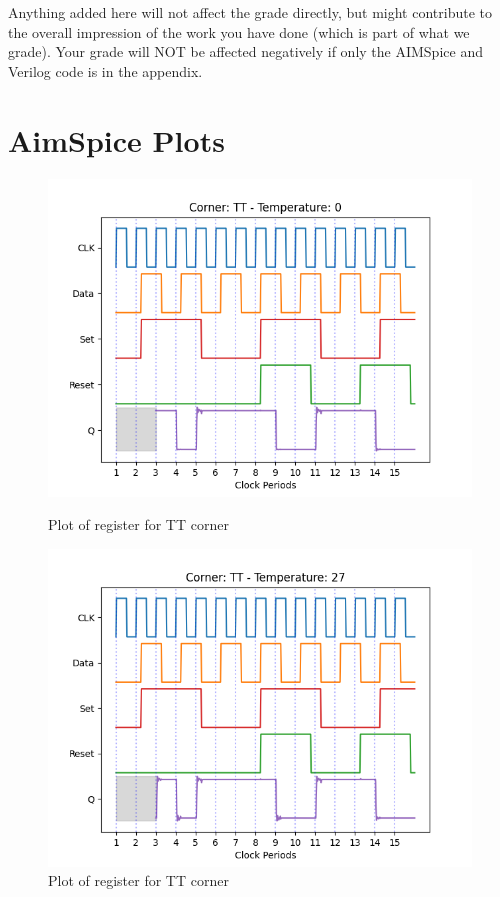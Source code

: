 Anything added here will not affect the grade directly, but might contribute to the overall impression of the work you have done (which is part of what we grade). Your grade will NOT be affected negatively if only the AIMSpice and Verilog code is in the appendix.

\newpage
\section{AimSpice Plots}
\label{appendix:aimspicePlots}

\begin{figure}[H]
    \begin{minipage}{0.5\textwidth}
        \centering
        \includegraphics[width=\textwidth]{Figures/Aimspice_Plots/TT_0.png}
        \caption{Plot of register for TT corner}
        \label{fig:TT0}
    \end{minipage}%
    \begin{minipage}{0.5\textwidth}
        \centering
        \includegraphics[width=\textwidth]{Figures/Aimspice_Plots/TT_27.png}
        \caption{Plot of register for TT corner}
        \label{fig:TT27}
    \end{minipage}
\end{figure}

